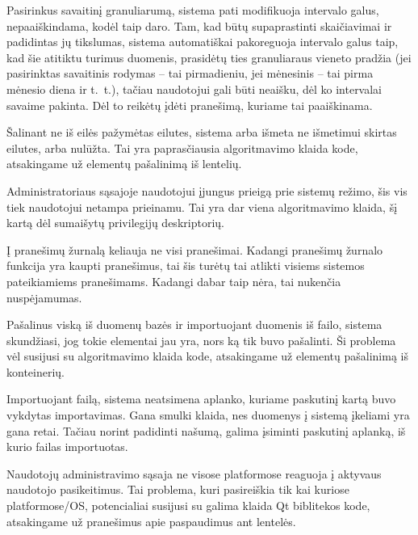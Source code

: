 {
  Pasirinkus savaitinį granuliarumą, sistema pati modifikuoja intervalo
  galus, nepaaiškindama, kodėl taip daro.
}
{
  Tam, kad būtų supaprastinti skaičiavimai ir padidintas jų tikslumas,
  sistema automatiškai pakoreguoja intervalo galus taip, kad šie atitiktu
  turimus duomenis, prasidėtų ties granuliaraus vieneto pradžia (jei
  pasirinktas savaitinis rodymas – tai pirmadieniu, jei mėnesinis – tai
  pirma mėnesio diena ir t.~t.), tačiau naudotojui gali būti neaišku, dėl
  ko intervalai savaime pakinta. Dėl to reikėtų įdėti pranešimą, kuriame tai
  paaiškinama.
}

{
  Šalinant ne iš eilės pažymėtas eilutes, sistema arba išmeta ne išmetimui
  skirtas eilutes, arba nulūžta.
}
{
  Tai yra paprasčiausia algoritmavimo klaida kode, atsakingame už elementų
  pašalinimą iš lentelių.
}

{
  Administratoriaus sąsajoje naudotojui įjungus prieigą prie sistemų
  režimo, šis vis tiek naudotojui netampa prieinamu.
}
{
  Tai yra dar viena algoritmavimo klaida, šį kartą dėl sumaišytų privilegijų
  deskriptorių.
}

{
  Į pranešimų žurnalą keliauja ne visi pranešimai.
}
{
  Kadangi pranešimų žurnalo funkcija yra kaupti pranešimus, tai šis turėtų tai atlikti
  visiems sistemos pateikiamiems pranešimams. Kadangi dabar taip nėra, tai nukenčia
  nuspėjamumas.
}

{
  Pašalinus viską iš duomenų bazės ir importuojant duomenis iš failo,
  sistema skundžiasi, jog tokie elementai jau yra, nors ką tik buvo pašalinti.
}
{
  Ši problema vėl susijusi su algoritmavimo klaida kode, atsakingame už
  elementų pašalinimą iš konteinerių.
}

{
  Importuojant failą, sistema neatsimena aplanko, kuriame paskutinį
  kartą buvo vykdytas importavimas.
}
{
  Gana smulki klaida, nes duomenys į sistemą įkeliami yra gana retai. Tačiau norint
  padidinti našumą, galima įsiminti paskutinį aplanką, iš kurio failas importuotas.
}

{
  Naudotojų administravimo sąsaja ne visose platformose reaguoja į
  aktyvaus naudotojo pasikeitimus.
}
{
  Tai problema, kuri pasireiškia tik kai kuriose platformose/OS, potencialiai susijusi
  su galima klaida Qt biblitekos kode, atsakingame už pranešimus apie paspaudimus ant 
  lentelės.
}


